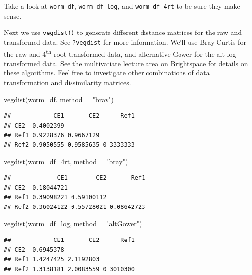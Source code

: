 \documentclass[
  11pt,
  a4paper,
]{book}
\newenvironment{Shaded}{\begin{snugshade}}{\end{snugshade}}
\newcommand{\AttributeTok}[1]{\textcolor[rgb]{0.77,0.63,0.00}{#1}}
\newcommand{\FunctionTok}[1]{\textcolor[rgb]{0.00,0.00,0.00}{#1}}
\newcommand{\NormalTok}[1]{#1}
\newcommand{\StringTok}[1]{\textcolor[rgb]{0.31,0.60,0.02}{#1}}
\begin{document}
Take a look at \texttt{worm\_df}, \texttt{worm\_df\_log}, and \texttt{worm\_df\_4rt} to be sure they make sense.

Next we use \texttt{vegdist()} to generate different distance matrices for the raw and transformed data. See \texttt{?vegdist} for more information. We'll use Bray-Curtis for the raw and 4\textsuperscript{th}-root transformed data, and alternative Gower for the alt-log transformed data. See the multivariate lecture area on Brightspace for details on these algorithms. Feel free to investigate other combinations of data transformation and dissimilarity matrices.

\begin{Shaded}
\begin{Highlighting}[]
\FunctionTok{vegdist}\NormalTok{(worm\_df, }\AttributeTok{method =} \StringTok{"bray"}\NormalTok{)}
\end{Highlighting}
\end{Shaded}

\begin{verbatim}
##            CE1       CE2      Ref1
## CE2  0.4002399                    
## Ref1 0.9228376 0.9667129          
## Ref2 0.9050555 0.9585635 0.3333333
\end{verbatim}

\begin{Shaded}
\begin{Highlighting}[]
\FunctionTok{vegdist}\NormalTok{(worm\_df\_4rt, }\AttributeTok{method =} \StringTok{"bray"}\NormalTok{)}
\end{Highlighting}
\end{Shaded}

\begin{verbatim}
##             CE1        CE2       Ref1
## CE2  0.18044721                      
## Ref1 0.39098221 0.59100112           
## Ref2 0.36024122 0.55728021 0.08642723
\end{verbatim}

\begin{Shaded}
\begin{Highlighting}[]
\FunctionTok{vegdist}\NormalTok{(worm\_df\_log, }\AttributeTok{method =} \StringTok{"altGower"}\NormalTok{)}
\end{Highlighting}
\end{Shaded}

\begin{verbatim}
##            CE1       CE2      Ref1
## CE2  0.6945378                    
## Ref1 1.4247425 2.1192803          
## Ref2 1.3138181 2.0083559 0.3010300
\end{verbatim}
\end{document}
